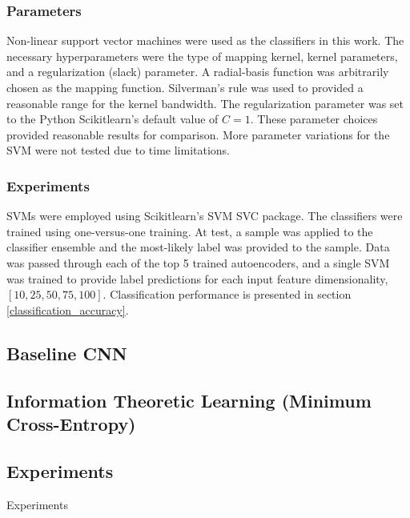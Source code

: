 \documentclass[conference]{IEEEtran}
\begin{document}
	 \subsubsection*{Parameters}
	 Non-linear support vector machines were used as the classifiers in this work. The necessary hyperparameters were the type of mapping kernel,  kernel parameters, and a regularization (slack) parameter.  A radial-basis function was arbitrarily chosen as the mapping function.  Silverman's rule was used to provided a reasonable range for the kernel bandwidth. The regularization parameter was set to the Python Scikitlearn's default value of $C=1$.  These parameter choices provided reasonable results for comparison.  More parameter variations for the SVM were not tested due to time limitations.
	 
	 \subsubsection*{Experiments}
	 SVMs were employed using Scikitlearn's SVM SVC package.  The classifiers were trained using one-versus-one training.  At test, a sample was applied to the classifier ensemble and the most-likely label was provided to the sample.  Data was passed through each of the top 5 trained autoencoders, and a single SVM was trained to provide label predictions for each input feature dimensionality, $[10,25,50,75,100]$.  Classification performance is presented in section \ref{classification_accuracy}. 
	 
	 
	 \subsection{Baseline CNN}
	 
	 
	 
	 
	 \subsection{Information Theoretic Learning (Minimum Cross-Entropy)}
	 
	 
	 
	 
	 
	 
	 
\subsection{Experiments} \label{Experiments}
Experiments 
\end{document}
